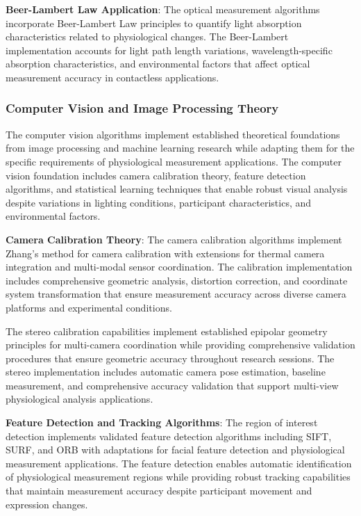 \documentclass[12pt,a4paper]{article}
\begin{document}
\textbf{Beer-Lambert Law Application}: The optical measurement algorithms incorporate Beer-Lambert Law principles to quantify
light absorption characteristics related to physiological changes. The Beer-Lambert implementation accounts for light
path length variations, wavelength-specific absorption characteristics, and environmental factors that affect optical
measurement accuracy in contactless applications.

\subsubsection{Computer Vision and Image Processing Theory}

The computer vision algorithms implement established theoretical foundations from image processing and machine learning
research while adapting them for the specific requirements of physiological measurement applications. The computer
vision foundation includes camera calibration theory, feature detection algorithms, and statistical learning techniques
that enable robust visual analysis despite variations in lighting conditions, participant characteristics, and
environmental factors.

\textbf{Camera Calibration Theory}: The camera calibration algorithms implement Zhang's method for camera calibration with
extensions for thermal camera integration and multi-modal sensor coordination. The calibration implementation includes
comprehensive geometric analysis, distortion correction, and coordinate system transformation that ensure measurement
accuracy across diverse camera platforms and experimental conditions.

The stereo calibration capabilities implement established epipolar geometry principles for multi-camera coordination
while providing comprehensive validation procedures that ensure geometric accuracy throughout research sessions. The
stereo implementation includes automatic camera pose estimation, baseline measurement, and comprehensive accuracy
validation that support multi-view physiological analysis applications.

\textbf{Feature Detection and Tracking Algorithms}: The region of interest detection implements validated feature detection
algorithms including SIFT, SURF, and ORB with adaptations for facial feature detection and physiological measurement
applications. The feature detection enables automatic identification of physiological measurement regions while
providing robust tracking capabilities that maintain measurement accuracy despite participant movement and expression
changes.
\end{document}
